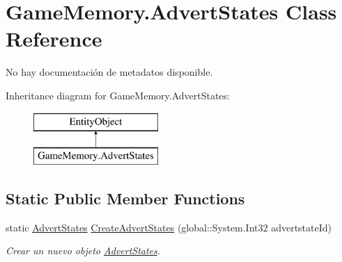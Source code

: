 \hypertarget{class_game_memory_1_1_advert_states}{\section{Game\-Memory.\-Advert\-States Class Reference}
\label{class_game_memory_1_1_advert_states}
}


No hay documentación de metadatos disponible.  


Inheritance diagram for Game\-Memory.\-Advert\-States\-:\begin{figure}[H]
\begin{center}
\leavevmode
\includegraphics[height=2.000000cm]{class_game_memory_1_1_advert_states}
\end{center}
\end{figure}
\subsection*{Static Public Member Functions}
\begin{DoxyCompactItemize}
\item 
static \hyperlink{class_game_memory_1_1_advert_states}{Advert\-States} \hyperlink{class_game_memory_1_1_advert_states_ab0f190c459d819abb2ac6f270e94e124}{Create\-Advert\-States} (global\-::\-System.\-Int32 advertstate\-Id)
\begin{DoxyCompactList}\small\item\em Crear un nuevo objeto \hyperlink{class_game_memory_1_1_advert_states}{Advert\-States}. \end{DoxyCompactList}\end{DoxyCompactItemize}

